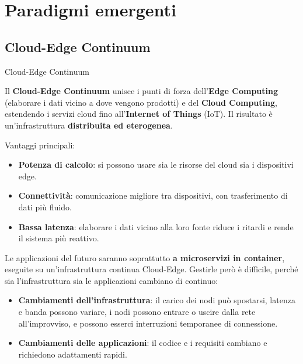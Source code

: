 \chapter{Paradigmi emergenti}\label{ch-11}


\section{Cloud-Edge Continuum}\label{cloud-edge-continuum}

\begin{boxdefinition}{Cloud-Edge Continuum}

Il \textbf{Cloud-Edge Continuum} unisce i punti di forza
dell'\textbf{Edge Computing} (elaborare i dati vicino a dove vengono
prodotti) e del \textbf{Cloud Computing}, estendendo i servizi cloud
fino all'\textbf{Internet of Things} (IoT). Il risultato è
un'infrastruttura \textbf{distribuita ed eterogenea}.

\end{boxdefinition}

Vantaggi principali:

\begin{itemize}
\tightlist
\item
  \textbf{Potenza di calcolo}: si possono usare sia le risorse del cloud
  sia i dispositivi edge.
\item
  \textbf{Connettività}: comunicazione migliore tra dispositivi, con
  trasferimento di dati più fluido.
\item
  \textbf{Bassa latenza}: elaborare i dati vicino alla loro fonte riduce
  i ritardi e rende il sistema più reattivo.
\end{itemize}

Le applicazioni del futuro saranno soprattutto \textbf{a microservizi in
container}, eseguite su un'infrastruttura continua Cloud-Edge. Gestirle
però è difficile, perché sia l'infrastruttura sia le applicazioni
cambiano di continuo:

\begin{itemize}
\tightlist
\item
  \textbf{Cambiamenti dell'infrastruttura}: il carico dei nodi può
  spostarsi, latenza e banda possono variare, i nodi possono entrare o
  uscire dalla rete all'improvviso, e possono esserci interruzioni
  temporanee di connessione.
\item
  \textbf{Cambiamenti delle applicazioni}: il codice e i requisiti
  cambiano e richiedono adattamenti rapidi.
\end{itemize}

